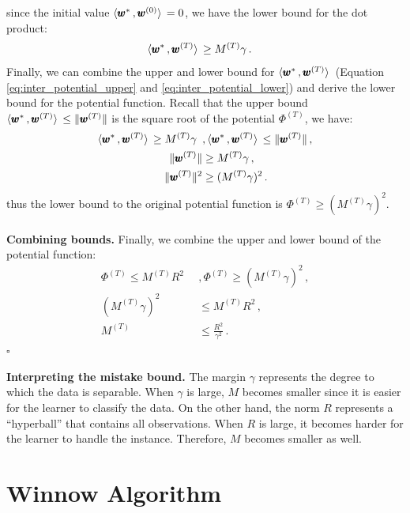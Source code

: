 \documentclass[11pt]{article}
\newcommand*{\QED}{\hfill\ensuremath{\square}}
\begin{document}
{since the initial value $\langle  \pmb{w}^{*}  \, ,  \pmb{w}^{(0)}  \rangle\, = 0$, we have the lower bound for the dot product:
\begin{align}
    \langle  \pmb{w}^{*}  \, ,  \pmb{w}^{(T)}  \rangle\, &\ge M^{(T)} \gamma \, . \label{eq:inter_potential_lower}
\end{align}
Finally, we can combine the upper and lower bound for $\langle  \pmb{w}^{*}  \, ,  \pmb{w}^{(T)}  \rangle\,$ (Equation \ref{eq:inter_potential_upper} and \ref{eq:inter_potential_lower}) and derive the lower bound for the potential function. Recall that the upper bound $\langle  \pmb{w}^{*}  \, ,  \pmb{w}^{(T)}  \rangle\, \le \| \pmb{w}^{(T)} \|$ is the square root of the potential $\Phi^{(T)}$, we have:
\begin{align}
    \langle  \pmb{w}^{*}  \, ,  \pmb{w}^{(T)}  \rangle\, \ge M^{(T)} \gamma \,\,\, &, \langle  \pmb{w}^{*}  \, ,  \pmb{w}^{(T)}  \rangle\, \le \| \pmb{w}^{(T)} \| \, , \nonumber \\
    \| \pmb{w}^{(T)} \| &\ge M^{(T)} \gamma\, , \nonumber \\
    \| \pmb{w}^{(T)} \|^{2} &\ge (M^{(T)} \gamma)^{2}\, .
\end{align}
thus the lower bound to the original potential function is $\Phi^{(T)} \ge (M^{(T)} \gamma)^{2}$. \\ \\
%
\textbf{Combining bounds.} Finally, we combine the upper and lower bound of the potential function:
\begin{align}
   \Phi^{(T)} \le M^{(T)} R^{2} \,\,\, &, \Phi^{(T)} \ge (M^{(T)} \gamma)^{2}\,, \nonumber \\
   (M^{(T)} \gamma)^{2} &\le M^{(T)} R^{2} \, , \nonumber \\
   M^{(T)} &\le \frac{R^2}{\gamma^2} \, .
\end{align} \QED
}

\textbf{Interpreting the mistake bound.} The margin $\gamma$ represents the degree to which the data is separable. When $\gamma$ is large, $M$ becomes smaller since it is easier for the learner to classify the data. On the other hand, the norm $R$ represents a ``hyperball'' that contains all observations. When $R$ is large, it becomes harder for the learner to handle the instance. Therefore, $M$ becomes smaller as well.


\section{Winnow Algorithm}
\end{document}
